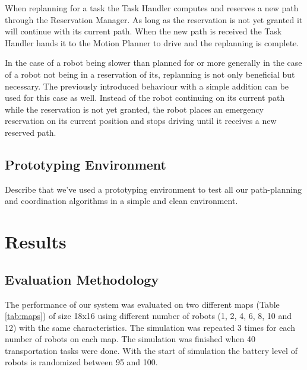 \documentclass[journal]{IEEEtran}
\begin{document}
When replanning for a task the Task Handler computes and reserves a new path through the Reservation Manager.
As long as the reservation is not yet granted it will continue with its current path.
When the new path is received the Task Handler hands it to the Motion Planner to drive and the replanning is complete.

In the case of a robot being slower than planned for or more generally in the case of a robot not being in a reservation of its, replanning is not only beneficial but necessary.
The previously introduced behaviour with a simple addition can be used for this case as well. Instead of the robot continuing on its current path while the reservation is not yet granted, the robot places an emergency reservation on its current position and stops driving until it receives a new reserved path.

\subsection{Prototyping Environment}
\label{subsec:prototyping_environment}
Describe that we've used a prototyping environment to test all our path-planning and coordination algorithms in a simple and clean environment.

\section{Results}
\label{sec:results}

\subsection{Evaluation Methodology}
\label{evaluation_methodology}
The performance of our system was evaluated on two different maps (Table \ref{tab:maps}) of size 18x16 using different number of robots (1, 2, 4, 6, 8, 10 and 12) with the same characteristics. The simulation was repeated 3 times for each number of robots on each map. The simulation was finished when 40 transportation tasks were done. With the start of simulation the battery level of robots is randomized between 95 and 100.
\end{document}
